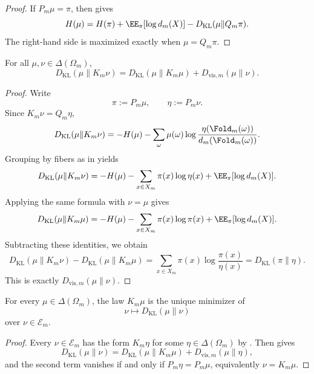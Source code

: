 \begin{proof}
If \(P_m\mu=\pi\), then  gives
\[
  H(\mu)
  =
  H(\pi)+\EE_\pi[\log d_m(X)]-D_{\mathrm{KL}}(\mu\|Q_m\pi).
\]
The right-hand side is maximized exactly when \(\mu=Q_m\pi\).
\end{proof}

\begin{theorem}
\label{thm:kl-pythagorean}
For all \(\mu,\nu\in\Delta(\Omega_m)\),
\[
  D_{\mathrm{KL}}(\mu\|K_m\nu)
  =
  D_{\mathrm{KL}}(\mu\|K_m\mu)+D_{\mathrm{vis},m}(\mu\|\nu).
\]
\end{theorem}

\begin{proof}
Write
\[
  \pi:=P_m\mu,
  \qquad
  \eta:=P_m\nu.
\]
Since \(K_m\nu=Q_m\eta\),
\[
  D_{\mathrm{KL}}(\mu\|K_m\nu)
  =
  -H(\mu)-\sum_{\omega}\mu(\omega)\log\frac{\eta(\Fold_m(\omega))}{d_m(\Fold_m(\omega))}.
\]
Grouping by fibers as in  yields
\[
  D_{\mathrm{KL}}(\mu\|K_m\nu)
  =
  -H(\mu)-\sum_{x\in X_m}\pi(x)\log \eta(x)
  +\EE_\pi[\log d_m(X)].
\]
Applying the same formula with \(\nu=\mu\) gives
\[
  D_{\mathrm{KL}}(\mu\|K_m\mu)
  =
  -H(\mu)-\sum_{x\in X_m}\pi(x)\log \pi(x)
  +\EE_\pi[\log d_m(X)].
\]
Subtracting these identities, we obtain
\[
  D_{\mathrm{KL}}(\mu\|K_m\nu)-D_{\mathrm{KL}}(\mu\|K_m\mu)
  =
  \sum_{x\in X_m}\pi(x)\log \frac{\pi(x)}{\eta(x)}
  =
  D_{\mathrm{KL}}(\pi\|\eta).
\]
This is exactly \(D_{\mathrm{vis},m}(\mu\|\nu)\).
\end{proof}

\begin{corollary}
\label{cor:i-projection}
For every \(\mu\in\Delta(\Omega_m)\), the law \(K_m\mu\) is the unique minimizer
of
\[
  \nu\longmapsto D_{\mathrm{KL}}(\mu\|\nu)
\]
over \(\nu\in\mathcal E_m\).
\end{corollary}

\begin{proof}
Every \(\nu\in\mathcal E_m\) has the form \(K_m\eta\) for some
\(\eta\in\Delta(\Omega_m)\) by .  Then
 gives
\[
  D_{\mathrm{KL}}(\mu\|\nu)
  =
  D_{\mathrm{KL}}(\mu\|K_m\mu)+D_{\mathrm{vis},m}(\mu\|\eta),
\]
and the second term vanishes if and only if \(P_m\eta=P_m\mu\), equivalently
\(\nu=K_m\mu\).
\end{proof}
